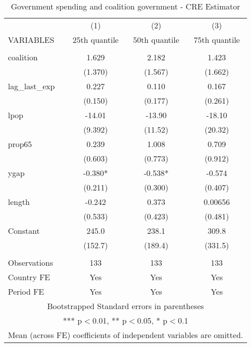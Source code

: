 \documentclass{article}
\begin{document}
\begin{table}
    \centering
    \caption{Government spending and coalition government - CRE Estimator}
    \begin{tabular}{lccc}
    &   &   & \\  \hline
     & (1) & (2) & (3) \\
    VARIABLES & 25th quantile & 50th quantile & 75th quantile \\ \hline
     &  &  &  \\
    coalition & 1.629 & 2.182 & 1.423 \\
     & (1.370) & (1.567) & (1.662) \\
    lag\_last\_exp & 0.227 & 0.110 & 0.167 \\
     & (0.150) & (0.177) & (0.261) \\
    lpop & -14.01 & -13.90 & -18.10 \\
     & (9.392) & (11.52) & (20.32) \\
    prop65 & 0.239 & 1.008 & 0.709 \\
     & (0.603) & (0.773) & (0.912) \\
    ygap & -0.380* & -0.538* & -0.574 \\
     & (0.211) & (0.300) & (0.407) \\
    length & -0.242 & 0.373 & 0.00656 \\
     & (0.533) & (0.423) & (0.481) \\
    Constant & 245.0 & 238.1 & 309.8 \\
     & (152.7) & (189.4) & (331.5) \\
     &  &  &  \\
    Observations & 133 & 133 & 133 \\
    Country FE & Yes & Yes & Yes \\
     Period FE & Yes & Yes & Yes \\ \hline
    \multicolumn{4}{c}{ Bootstrapped Standard errors in parentheses} \\
    \multicolumn{4}{c}{ *** p$<$0.01, ** p$<$0.05, * p$<$0.1} \\
    \multicolumn{4}{c}{Mean (across FE) coefficients of independent variables are omitted.} \\
    \end{tabular}
    \label{tab:cre_results}
\end{table}
\end{document}

